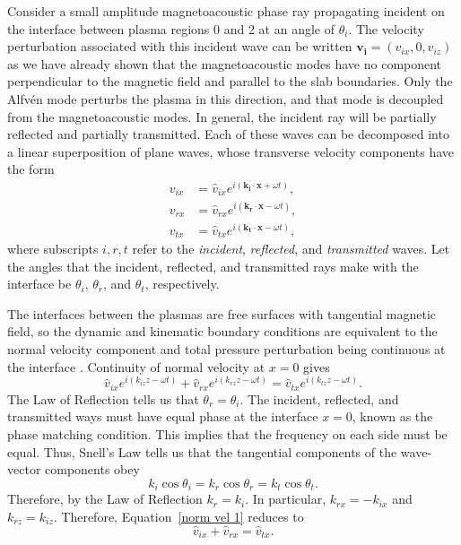 	Consider a small amplitude magnetoacoustic phase ray propagating incident on the interface between plasma regions 0 and 2 at an angle of $\theta_i$. The velocity perturbation associated with this incident wave can be written $\mathbf{v_i} = (v_{ix}, 0, v_{iz})$ as we have already shown that the magnetoacoustic modes have no component perpendicular to the magnetic field and parallel to the slab boundaries. Only the Alfv\'{e}n mode perturbs the plasma in this direction, and that mode is decoupled from the magnetoacoustic modes. In general, the incident ray will be partially reflected and partially transmitted. Each of these waves can be decomposed into a linear superposition of plane waves, whose transverse velocity components have the form
	\begin{align}
	v_{ix} &= \hat{v}_{ix} e^{i(\mathbf{k_i}\cdot \mathbf{x} + \omega t)}, \\
	v_{rx} &= \hat{v}_{rx} e^{i(\mathbf{k_r}\cdot \mathbf{x} - \omega t)}, \\
	v_{tx} &= \hat{v}_{tx} e^{i(\mathbf{k_t}\cdot \mathbf{x} - \omega t)},
	\label{fourier}
	\end{align}
	where subscripts $i, r, t$ refer to the \textit{incident}, \textit{reflected}, and \textit{transmitted} waves. Let the angles that the incident, reflected, and transmitted rays make with the interface be $\theta_i$, $\theta_r$, and $\theta_t$, respectively.
	
	The interfaces between the plasmas are free surfaces with tangential magnetic field, so the dynamic and kinematic boundary conditions are equivalent to the normal velocity component and total pressure perturbation being continuous at the interface \citep{goe_etal04}. Continuity of normal velocity at $x = 0$ gives
	\begin{equation}
	\hat{v}_{ix}e^{i(k_{iz}z - \omega t)} + \hat{v}_{rx}e^{i(k_{rz}z - \omega t)} = \hat{v}_{tx}e^{i(k_{tz}z - \omega t)}. \label{norm vel 1}
	\end{equation}
	The Law of Reflection tells us that $\theta_r = \theta_i$. The incident, reflected, and transmitted ways must have equal phase at the interface $x = 0$, known as the phase matching condition. This implies that the frequency on each side must be equal. Thus, Snell's Law tells us that the tangential components of the wave-vector components obey
	\begin{equation}
	k_i\cos{\theta_i} = k_r\cos{\theta_r} = k_t\cos{\theta_t}. \label{tang comp}
	\end{equation}
	Therefore, by the Law of Reflection $k_r = k_i$. In particular, $k_{rx} = -k_{ix}$ and $k_{rz} = k_{iz}$. Therefore, Equation~\eqref{norm vel 1} reduces to
	\begin{equation}
	\hat{v}_{ix} + \hat{v}_{rx} = \hat{v}_{tx}. \label{cont vel}
	\end{equation}
	

